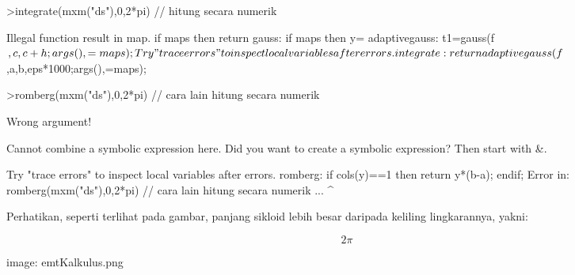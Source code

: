 \documentclass{article}
\begin{document}
\begin{eulernotebook}
\begin{eulercomment}
\begin{eulercomment}
\begin{eulercomment}
\begin{eulercomment}
\begin{eulercomment}
\begin{eulercomment}
\begin{eulercomment}
\begin{eulercomment}
\begin{eulercomment}
\begin{eulercomment}
\begin{eulercomment}
\begin{eulercomment}
\begin{eulercomment}
\begin{eulercomment}
\begin{eulercomment}
\begin{eulercomment}
\begin{eulercomment}
\begin{eulercomment}
\begin{eulerprompt}
>integrate(mxm("ds"),0,2*pi) // hitung secara numerik
\end{eulerprompt}
\begin{euleroutput}
  Illegal function result in map.
      if maps then return %
  gauss:
      if maps then y=%
  adaptivegauss:
      t1=gauss(f$,c,c+h;args(),=maps);
  Try "trace errors" to inspect local variables after errors.
  integrate:
      return adaptivegauss(f$,a,b,eps*1000;args(),=maps);
\end{euleroutput}
\begin{eulerprompt}
>romberg(mxm("ds"),0,2*pi) // cara lain hitung secara numerik
\end{eulerprompt}
\begin{euleroutput}
  Wrong argument!
  
  Cannot combine a symbolic expression here.
  Did you want to create a symbolic expression?
  Then start with &.
  
  Try "trace errors" to inspect local variables after errors.
  romberg:
      if cols(y)==1 then return y*(b-a); endif;
  Error in:
  romberg(mxm("ds"),0,2*pi) // cara lain hitung secara numerik ...
                           ^
\end{euleroutput}
\begin{eulercomment}
Perhatikan, seperti terlihat pada gambar, panjang sikloid lebih besar
daripada keliling lingkarannya, yakni:\\
\end{eulercomment}
\begin{eulerformula}
\[
2\pi
\]
\end{eulerformula}
\begin{eulercomment}
\begin{eulercomment}
\begin{eulercomment}
image: emtKalkulus.png


\end{eulercomment}
\end{eulercomment}
\end{eulercomment}
\end{eulercomment}
\end{eulercomment}
\end{eulercomment}
\end{eulercomment}
\end{eulercomment}
\end{eulercomment}
\end{eulercomment}
\end{eulercomment}
\end{eulercomment}
\end{eulercomment}
\end{eulercomment}
\end{eulercomment}
\end{eulercomment}
\end{eulercomment}
\end{eulercomment}
\end{eulercomment}
\end{eulercomment}
\end{eulercomment}
\end{eulernotebook}
\end{document}
